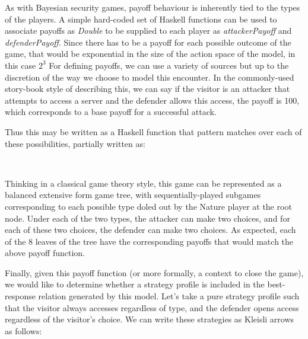 As with Bayesian security games, payoff behaviour is inherently tied to the types of the players. A simple hard-coded set of Haskell functions can be used to associate payoffs as \textit{Double} to be supplied to each player as \textit{attackerPayoff} and \textit{defenderPayoff}. Since there has to be a payoff for each possible outcome of the game, that would be exponential in the size of the action space of the model, in this case ${2^3}$ For defining payoffs, we can use a variety of sources but up to the discretion of the way we choose to model this encounter. In the commonly-used story-book style of describing this, we can say if the visitor is an attacker that attempts to access a server and the defender allows this access, the payoff is 100, which corresponds to a base payoff for a successful attack.

Thus this may be written as a Haskell function that pattern matches over each of these possibilities, partially written as: 

\begin{hscode}\SaveRestoreHook
	\>[B]{}\mathbin{::}\to {}\to {}\to {}\<[E]%
	\\
	\>[B]{}\;\;\;\mathrel{=}\<[E]%
	\ColumnHook
\end{hscode}

Thinking in a classical game theory style, this game can be represented as a balanced extensive form game tree, with sequentially-played subgames corresponding to each possible type doled out by the Nature player at the root node. Under each of the two types, the attacker can make two choices, and for each of these two choices, the defender can make two choices. As expected, each of the 8 leaves of the tree have the corresponding payoffs that would match the above payoff function.

Finally, given this payoff function (or more formally, a context to close the game), we would like to determine whether a strategy profile is included in the best-response relation generated by this model. Let's take a pure strategy profile such that the visitor always accesses regardless of type, and the defender opens access regardless of the visitor's choice. We can write these strategies as Kleisli arrows as follows: 


